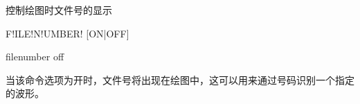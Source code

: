 \label{cmd:filenumber}

控制绘图时文件号的显示

\begin{SACSTX}
F!ILE!N!UMBER! [ON|OFF]
\end{SACSTX}

\begin{SACDFT}
filenumber off
\end{SACDFT}

当该命令选项为开时，文件号将出现在绘图中，这可以用来通过号码识别一个指定的波形。
